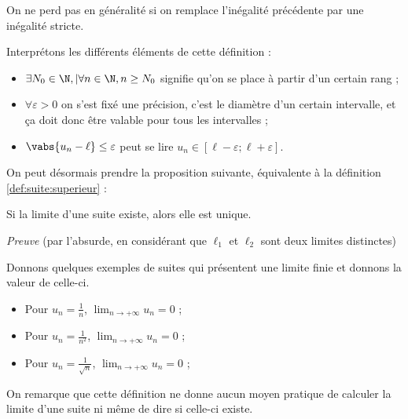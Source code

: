 \documentclass[12pt,a4paper,frenchb]{article}
\begin{document}
On ne perd pas en généralité si on remplace l'inégalité précédente par
une inégalité stricte.

Interprétons les différents éléments de cette définition :
\begin{itemize}
  \item $\exists N_0\in\N, | \forall n \in\N , n\geq N_0$ signifie qu'on se
    place à partir d'un certain rang ;
  \item $\forall \varepsilon > 0$ on s'est fixé une précision, c'est le
    diamètre d'un certain intervalle, et ça doit donc être valable pour tous
    les intervalles ;
  \item $\vabs{u_n - \ell} \leq \varepsilon$ peut se lire $u_n \in [ \ell -
    \varepsilon ; \ell + \varepsilon ]$.
\end{itemize}

On peut désormais prendre la proposition suivante, équivalente à la
définition \ref{def:suite:superieur} :


\begin{remarque}
  Si la limite d'une suite existe, alors elle est unique.
\end{remarque}

\begin{minipage}{0.99\linewidth}
  \emph{Preuve} (par l'absurde, en considérant que $\ell_1$ et $\ell_2$ sont
  deux limites distinctes)
  \vspace{3cm}
\end{minipage}

Donnons quelques exemples de suites qui présentent une limite finie et
donnons la valeur de celle-ci.

\begin{itemize}
  \item Pour $u_n = \frac1n$, $\lim_{n\to +\infty}u_n = 0$ ;
  \item Pour $u_n = \frac1{n^2}$, $\lim_{n\to +\infty}u_n = 0$ ;
  \item Pour $u_n = \frac1{\sqrt{n}}$, $\lim_{n\to +\infty}u_n = 0$ ;
\end{itemize}

On remarque que cette définition ne donne aucun moyen pratique de
calculer la limite d'une suite ni même de dire si celle-ci existe.
\end{document}
